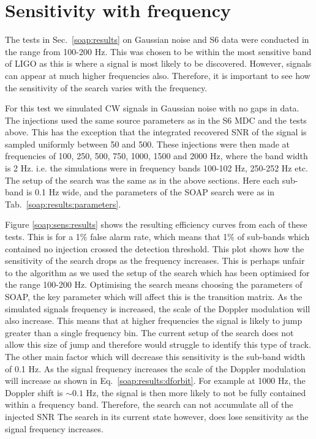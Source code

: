 \clearpage

\section{\label{soap:sensfreq}Sensitivity with frequency}

The tests in Sec.~\ref{soap:results} on Gaussian noise and S6 data were conducted in the range from 100-200 Hz.
This was chosen to be within the most sensitive band of \gls{LIGO} as this is where a signal is most likely to be discovered.
However, signals can appear at much higher frequencies also.
Therefore, it is important to see how the sensitivity of the search varies with the frequency.
 
For this test we simulated \gls{CW} signals in Gaussian noise with no gaps in data. 
The injections used the same source parameters as in the S6 \gls{MDC} \citep{walsh2016ComparisonMethods} and the tests above. 
This has the exception that the integrated recovered \gls{SNR} of the signal is sampled uniformly between 50 and 500. 
These injections were then made at frequencies of 100, 250, 500, 750, 1000, 1500 and 2000 Hz, where the band width is 2 Hz. i.e. the simulations were in frequency bands 100-102 Hz, 250-252 Hz etc.
The setup of the search was the same as in the above sections. 
Here each sub-band is 0.1 Hz wide, and the parameters of the SOAP search were as in Tab.~\ref{soap:results:parameters}.

Figure \ref{soap:sens:results} shows the resulting efficiency curves from each of these tests.
This is for a 1\% false alarm rate, which means that 1\% of sub-bands which contained no injection crossed the detection threshold. 
This plot shows how the sensitivity of the search drops as the frequency increases.
This is perhaps unfair to the algorithm as we used the setup of the search which has been optimised for the range 100-200 Hz.
Optimising the search means choosing the parameters of SOAP, the key parameter which will affect this is the transition matrix. 
As the simulated signals frequency is increased, the scale of the Doppler modulation will also increase.
This means that at higher frequencies the signal is likely to jump greater than a single frequency bin. 
The current setup of the search does not allow this size of jump and therefore would struggle to identify this type of track.
The other main factor which will decrease this sensitivity is the sub-band width of 0.1 Hz. 
As the signal frequency increases the scale of the
Doppler modulation will increase as shown in Eq.~\ref{soap:results:dforbit}.
For example at 1000 Hz, the Doppler shift is $\sim 0.1$ Hz, the signal is then more likely to not be fully contained within a frequency band. 
Therefore, the search can not accumulate all of the injected \gls{SNR}
The search in its current state however, does lose sensitivity as the signal frequency increases.

